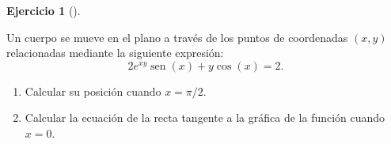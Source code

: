 \documentclass[
  spanish,
  a4paper,
]{scrreport}
\providecommand{\tightlist}{%
  \setlength{\itemsep}{0pt}\setlength{\parskip}{0pt}}
\theoremstyle{definition}
\newtheorem{exercise}{Ejercicio}[chapter]
\theoremstyle{remark}
\begin{document}
\begin{exercise}[]\protect\hypertarget{exr-derivada-implicita-3}{}\label{exr-derivada-implicita-3}

Un cuerpo se mueve en el plano a través de los puntos de coordenadas
\((x,y)\) relacionadas mediante la siguiente expresión: \[
2e^{xy} \operatorname{sen}(x) + y\cos(x) = 2.
\]

\begin{enumerate}
\def\labelenumi{\alph{enumi}.}
\tightlist
\item
  Calcular su posición cuando \(x=\pi/2\).
\item
  Calcular la ecuación de la recta tangente a la gráfica de la función
  cuando \(x=0\).
\end{enumerate}

\end{exercise}
\end{document}
